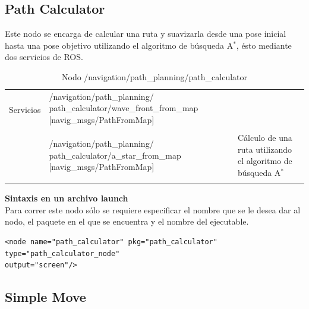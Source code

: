 \documentclass[user_manual.tex]{subfiles}
\begin{document}
\subsection{Path Calculator}
Este nodo se encarga de calcular una ruta y suavizarla desde una pose inicial hasta una pose objetivo utilizando el algoritmo de búsqueda A$ ^{*} $, ésto mediante dos servicios de ROS.\\
\begin{table}[H]
\begin{center}
\begin{tabular}{|l|p{6cm}|p{5cm}|}%
\hline

\multirow{2}{*}{Servicios}
& /navigation/path\_planning/ \newline path\_calculator/wave\_front\_from\_map [navig\_msgs/PathFromMap] &  \\
& & \\
& /navigation/path\_planning/ \newline path\_calculator/a\_star\_from\_map [navig\_msgs/PathFromMap] & Cálculo de una ruta utilizando el algoritmo de búsqueda A$ ^{*} $ \\
& & \\
\cline{1-3}

\end{tabular}
\caption{Nodo /navigation/path\_planning/path\_calculator}
\label{path calculator node}
\end{center}
\end{table}

\textbf{Sintaxis en un archivo launch}\\
Para correr este nodo sólo se requiere especificar el nombre que se le desea dar al nodo, el paquete en el que se encuentra y el nombre del ejecutable.\\
\begin{verbatim}
<node name="path_calculator" pkg="path_calculator" type="path_calculator_node" 
output="screen"/>
\end{verbatim}

\subsection{Simple Move}
\end{document}
